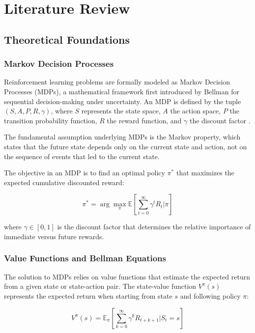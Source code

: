 \section{Literature Review}

\subsection{Theoretical Foundations}

\subsubsection{Markov Decision Processes}
Reinforcement learning problems are formally modeled as Markov Decision Processes (MDPs), a mathematical framework first introduced by Bellman \cite{bellman1957} for sequential decision-making under uncertainty. An MDP is defined by the tuple $(S, A, P, R, \gamma)$, where $S$ represents the state space, $A$ the action space, $P$ the transition probability function, $R$ the reward function, and $\gamma$ the discount factor \cite{sutton2018reinforcement}.

The fundamental assumption underlying MDPs is the Markov property, which states that the future state depends only on the current state and action, not on the sequence of events that led to the current state.

The objective in an MDP is to find an optimal policy $\pi^*$ that maximizes the expected cumulative discounted reward:

\begin{equation}
\pi^* = \arg\max_\pi \mathbb{E}\left[\sum_{t=0}^{\infty} \gamma^t R_t | \pi\right]
\end{equation}

where $\gamma \in [0,1]$ is the discount factor that determines the relative importance of immediate versus future rewards.

\subsubsection{Value Functions and Bellman Equations}
The solution to MDPs relies on value functions that estimate the expected return from a given state or state-action pair. The state-value function $V^\pi(s)$ represents the expected return when starting from state $s$ and following policy $\pi$:

\begin{equation}
V^\pi(s) = \mathbb{E}_\pi\left[\sum_{k=0}^{\infty} \gamma^k R_{t+k+1} | S_t = s\right]
\end{equation}

